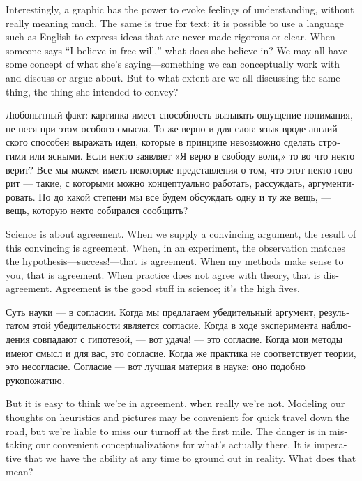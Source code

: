 \documentclass[a4paper]{book}
\theoremstyle{myth}
\begin{document}
\begin{english}
Interestingly, a graphic has the power to evoke feelings of understanding, without really meaning much. The same is true for text: it is possible to use a language such as English to express ideas that are never made rigorous or clear. When someone says “I believe in free will,” what does she believe in? We may all have some concept of what she's saying---something we can conceptually work with and discuss or argue about. But to what extent are we all discussing the same thing, the thing she intended to convey?

\begin{russian}Любопытный факт: картинка имеет способность вызывать ощущение понимания, не неся при этом особого смысла. То же верно и для слов: язык вроде английского способен выражать идеи, которые в принципе невозможно сделать строгими или ясными. Если некто заявляет «Я верю в свободу воли,» то во что некто верит? Все мы можем иметь некоторые представления о том, что этот некто говорит — такие, с которыми можно концептуально работать, рассуждать, аргументировать. Но до какой степени мы все будем обсуждать одну и ту же вещь, — вещь, которую некто собирался сообщить? \end{russian}

Science is about agreement. When we supply a convincing argument, the result of this convincing is agreement. When, in an experiment, the observation matches the hypothesis---success!---that is agreement. When my methods make sense to you, that is agreement. When practice does not agree with theory, that is disagreement. Agreement is the good stuff in science; it's the high fives.

\begin{russian} Суть науки — в согласии. Когда мы предлагаем убедительный аргумент,  результатом этой убедительности является согласие. Когда в ходе эксперимента наблюдения совпадают с гипотезой, — вот удача! — это согласие. Когда мои методы имеют смысл и для вас, это согласие. Когда же практика не соответствует теории, это несогласие. Согласие — вот лучшая материя в науке; оно подобно рукопожатию. \end{russian}

But it is easy to think we're in agreement, when really we're not. Modeling our thoughts on heuristics and pictures may be convenient for quick travel down the road, but we're liable to miss our turnoff at the first mile. The danger is in mistaking our convenient conceptualizations for what's actually there. It is imperative that we have the ability at any time to ground out in reality. What does that mean?


\end{english}
\end{document}

